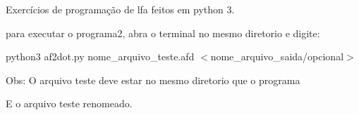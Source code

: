 Exercícios de programação de lfa feitos em python 3.

para executar o programa2, abra o terminal no mesmo diretorio e digite\+:

python3 af2dot.\+py nome\+\_\+arquivo\+\_\+teste.\+afd $<$nome\+\_\+arquivo\+\_\+saida/opcional$>$

Obs\+: O arquivo teste deve estar no mesmo diretorio que o programa

E o arquivo teste renomeado. 